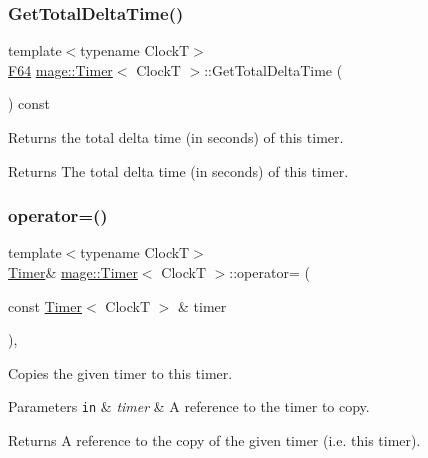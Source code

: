 \subsubsection{\texorpdfstring{Get\+Total\+Delta\+Time()}{GetTotalDeltaTime()}}
{\footnotesize\ttfamily template$<$typename ClockT$>$ \\
\hyperlink{namespacemage_ad26233bbec640deda836e572c1a23708}{F64} \hyperlink{classmage_1_1_timer}{mage\+::\+Timer}$<$ ClockT $>$\+::Get\+Total\+Delta\+Time (\begin{DoxyParamCaption}{ }\end{DoxyParamCaption}) const\hspace{0.3cm}{\ttfamily [noexcept]}}

Returns the total delta time (in seconds) of this timer.

\begin{DoxyReturn}{Returns}
The total delta time (in seconds) of this timer. 
\end{DoxyReturn}
\hypertarget{classmage_1_1_timer_a2a8aefb272e02d8ba4a26058df80f119}{}\label{classmage_1_1_timer_a2a8aefb272e02d8ba4a26058df80f119} 
\subsubsection{\texorpdfstring{operator=()}{operator=()}\hspace{0.1cm}{\footnotesize\ttfamily [1/2]}}
{\footnotesize\ttfamily template$<$typename ClockT$>$ \\
\hyperlink{classmage_1_1_timer}{Timer}\& \hyperlink{classmage_1_1_timer}{mage\+::\+Timer}$<$ ClockT $>$\+::operator= (\begin{DoxyParamCaption}\item[{const \hyperlink{classmage_1_1_timer}{Timer}$<$ ClockT $>$ \&}]{timer }\end{DoxyParamCaption})\hspace{0.3cm}{\ttfamily [default]}, {\ttfamily [noexcept]}}

Copies the given timer to this timer.


\begin{DoxyParams}[1]{Parameters}
\mbox{\tt in}  & {\em timer} & A reference to the timer to copy. \\
\hline
\end{DoxyParams}
\begin{DoxyReturn}{Returns}
A reference to the copy of the given timer (i.\+e. this timer). 
\end{DoxyReturn}
\hypertarget{classmage_1_1_timer_a39654f81efccc38a4cbe6164659407dd}{}\label{classmage_1_1_timer_a39654f81efccc38a4cbe6164659407dd} 
